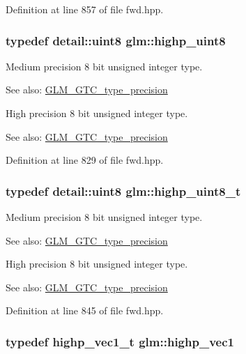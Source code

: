 Definition at line 857 of file fwd.hpp.\hypertarget{group__gtc__type__precision_g2c27c6dd26e893786f04b10f99c1ee95}{
\subsubsection[highp\_\-uint8]{\setlength{\rightskip}{0pt plus 5cm}typedef detail::uint8 {\bf glm::highp\_\-uint8}}}
\label{group__gtc__type__precision_g2c27c6dd26e893786f04b10f99c1ee95}


Medium precision 8 bit unsigned integer type. \begin{Desc}
\item[See also:]\hyperlink{group__gtc__type__precision}{GLM\_\-GTC\_\-type\_\-precision}\end{Desc}
High precision 8 bit unsigned integer type. \begin{Desc}
\item[See also:]\hyperlink{group__gtc__type__precision}{GLM\_\-GTC\_\-type\_\-precision} \end{Desc}


Definition at line 829 of file fwd.hpp.\hypertarget{group__gtc__type__precision_g9ba529fcc75b82d23da979f0ce6e4518}{
\subsubsection[highp\_\-uint8\_\-t]{\setlength{\rightskip}{0pt plus 5cm}typedef detail::uint8 {\bf glm::highp\_\-uint8\_\-t}}}
\label{group__gtc__type__precision_g9ba529fcc75b82d23da979f0ce6e4518}


Medium precision 8 bit unsigned integer type. \begin{Desc}
\item[See also:]\hyperlink{group__gtc__type__precision}{GLM\_\-GTC\_\-type\_\-precision}\end{Desc}
High precision 8 bit unsigned integer type. \begin{Desc}
\item[See also:]\hyperlink{group__gtc__type__precision}{GLM\_\-GTC\_\-type\_\-precision} \end{Desc}


Definition at line 845 of file fwd.hpp.\hypertarget{group__gtc__type__precision_gb3f08c031846e7a95b49e81c48d920d3}{
\subsubsection[highp\_\-vec1]{\setlength{\rightskip}{0pt plus 5cm}typedef highp\_\-vec1\_\-t {\bf glm::highp\_\-vec1}}}
\label{group__gtc__type__precision_gb3f08c031846e7a95b49e81c48d920d3}


